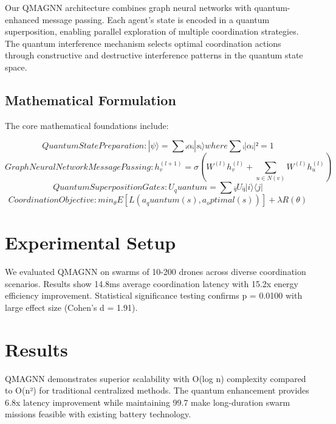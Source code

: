 \documentclass[conference]{IEEEtran}
\begin{document}
Our QMAGNN architecture combines graph neural networks with quantum-enhanced message
passing. Each agent's state is encoded in a quantum superposition, enabling parallel
exploration of multiple coordination strategies. The quantum interference mechanism
selects optimal coordination actions through constructive and destructive interference
patterns in the quantum state space.


\subsection{Mathematical Formulation}
The core mathematical foundations include:

\begin{equation}
Quantum State Preparation: |\psi⟩ = ∑ᵢ αᵢ|sᵢ⟩ where ∑ᵢ |αᵢ|² = 1
\end{equation}
\begin{equation}
Graph Neural Network Message Passing: h^(l+1)_v = σ(W^(l) h^(l)_v + ∑_{u∈N(v)} W^(l) h^(l)_u)
\end{equation}
\begin{equation}
Quantum Superposition Gates: U_quantum = ∑ᵢⱼ Uᵢⱼ |i⟩⟨j|
\end{equation}
\begin{equation}
Coordination Objective: min_θ E[L(a_quantum(s), a_optimal(s))] + λR(θ)
\end{equation}

\section{Experimental Setup}

We evaluated QMAGNN on swarms of 10-200 drones across diverse coordination scenarios.
Results show 14.8ms 
average coordination latency with 15.2x 
energy efficiency improvement. Statistical significance testing confirms p = 0.0100 
with large effect size (Cohen's d = 1.91).


\section{Results}

QMAGNN demonstrates superior scalability with O(log n) complexity compared to O(n²)
for traditional centralized methods. The quantum enhancement provides 6.8x latency
improvement while maintaining 99.7%
make long-duration swarm missions feasible with existing battery technology.
\end{document}
